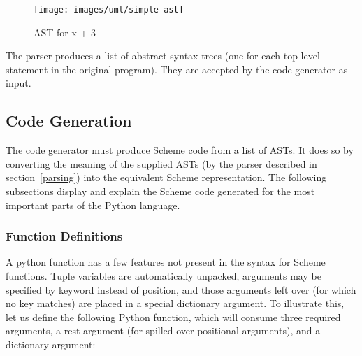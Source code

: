 \begin{figure}
	\caption{AST for x + 3}
	\label{simpleastfig}
	\begin{center}
		\texttt{[image: images/uml/simple-ast]}
	\end{center}
\end{figure}



The parser produces a list of abstract syntax trees (one for each top-level statement in the original program).  They are accepted by the code generator as input.

\subsection{Code Generation}
\label{codegeneration}

The code generator must produce Scheme code from a list of ASTs.  It does so by converting the meaning of the supplied ASTs (by the parser described in section~\ref{parsing}) into the equivalent Scheme representation.  The following subsections display and explain the Scheme code generated for the most important parts of the Python language.

\subsubsection{Function Definitions}
\label{functions}

A python function has a few features not present in the syntax for Scheme functions.  Tuple variables are automatically unpacked, arguments may be specified by keyword instead of position, and those arguments left over (for which no key matches) are placed in a special dictionary argument.  To illustrate this, let us define the following Python function, which will consume three required arguments, a rest argument (for spilled-over positional arguments), and a dictionary argument:

